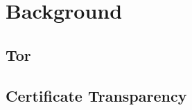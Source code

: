 \section{Background} \label{sec:background}

\subsection{Tor} \label{sec:background:tor}

\subsection{Certificate Transparency} \label{sec:background:ct}
